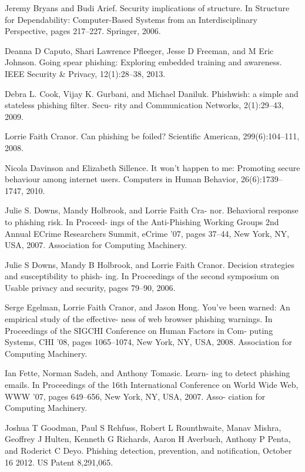 \documentclass[lettersize,journal]{IEEEtran}
\begin{document}
\begin{thebibliography}{1}
  

  Jeremy Bryans and Budi Arief. Security implications of structure. In Structure for Dependability: Computer-Based Systems from an Interdisciplinary Perspective, pages 217–227. Springer, 2006.

  Deanna D Caputo, Shari Lawrence Pfleeger, Jesse D
  Freeman, and M Eric Johnson. Going spear phishing:
  Exploring embedded training and awareness. IEEE
  Security & Privacy, 12(1):28–38, 2013.

  Debra L. Cook, Vijay K. Gurbani, and Michael Daniluk.
  Phishwish: a simple and stateless phishing filter. Secu-
  rity and Communication Networks, 2(1):29–43, 2009.

  Lorrie Faith Cranor. Can phishing be foiled? Scientific
  American, 299(6):104–111, 2008.

  Nicola Davinson and Elizabeth Sillence. It won’t happen
  to me: Promoting secure behaviour among internet users.
  Computers in Human Behavior, 26(6):1739–1747, 2010.

  Julie S. Downs, Mandy Holbrook, and Lorrie Faith Cra-
  nor. Behavioral response to phishing risk. In Proceed-
  ings of the Anti-Phishing Working Groups 2nd Annual
  ECrime Researchers Summit, eCrime ’07, pages 37–44,
  New York, NY, USA, 2007. Association for Computing
  Machinery.

  Julie S Downs, Mandy B Holbrook, and Lorrie Faith
  Cranor. Decision strategies and susceptibility to phish-
  ing. In Proceedings of the second symposium on Usable
  privacy and security, pages 79–90, 2006.

  Serge Egelman, Lorrie Faith Cranor, and Jason Hong.
  You’ve been warned: An empirical study of the effective-
  ness of web browser phishing warnings. In Proceedings
  of the SIGCHI Conference on Human Factors in Com-
  puting Systems, CHI ’08, pages 1065–1074, New York,
  NY, USA, 2008. Association for Computing Machinery.

  Ian Fette, Norman Sadeh, and Anthony Tomasic. Learn-
  ing to detect phishing emails. In Proceedings of the 16th
  International Conference on World Wide Web, WWW
  ’07, pages 649–656, New York, NY, USA, 2007. Asso-
  ciation for Computing Machinery.

  Joshua T Goodman, Paul S Rehfuss, Robert L Rounthwaite, Manav Mishra, Geoffrey J Hulten, Kenneth G Richards, Aaron H Averbuch, Anthony P Penta, and Roderict C Deyo. Phishing detection, prevention, and notification, October 16 2012. US Patent 8,291,065.


\end{thebibliography}
\end{document}
